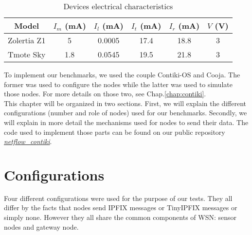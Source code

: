\begin{table}
  \centering

  \begin{tabular}{|c|c|c|c|c|c|}
    \hline
    Model & $I_m$ (mA) & $I_l$ (mA) & $I_t$ (mA) & $I_r$ (mA) & $V$ (V)\\
    \hline
    Zolertia Z1 & 5 & 0.0005 & 17.4 & 18.8 & 3 \\
    \hline
    Tmote Sky & 1.8 & 0.0545 & 19.5 & 21.8 & 3 \\
    \hline
  \end{tabular}
  \caption{Devices electrical characteristics}
  \label{table:device_consumption}
\end{table}

To implement our benchmarks, we used the couple Contiki-OS and Cooja. The former was used to configure the nodes while the latter was used to simulate those nodes. For more details on those two, see Chap.\ref{chap:contiki}.\\

This chapter will be organized in two sections. First, we will explain the different configurations (number and role of nodes) used for our benchmarks. Secondly, we will explain in more detail the mechanisms used for nodes to send their data. The code used to implement those parts can be found on our public repository \textit{\href{https://github.com/edd19/netflow_contiki}{netflow\_contiki}}.

\section{Configurations}

Four different configurations were used for the purpose of our tests. They all differ by the facts that nodes send IPFIX messages or TinyIPFIX messages  or simply none. However they all share the common components of WSN: sensor nodes and gateway node.

